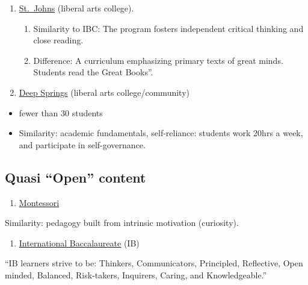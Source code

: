\documentclass[
]{book}
\providecommand{\tightlist}{%
  \setlength{\itemsep}{0pt}\setlength{\parskip}{0pt}}
\begin{document}
\begin{enumerate}
\def\labelenumi{\arabic{enumi}.}
\item
  \href{https://www.sjc.edu/academic-programs}{St.~Johns} (liberal arts college).

  \begin{enumerate}
  \def\labelenumii{\arabic{enumii}.}
  \tightlist
  \item
    Similarity to IBC: The program fosters independent critical thinking and close reading.
  \item
    Difference: A curriculum emphasizing primary texts of great minds. Students read the Great Books''.
  \end{enumerate}
\item
  \href{https://en.wikipedia.org/wiki/Deep_Springs_College}{Deep Springs} (liberal arts college/community)
\end{enumerate}

\begin{itemize}
\item
  fewer than 30 students
\item
  Similarity: academic fundamentals, self-reliance: students work 20hrs a week, and participate in self-governance.
\end{itemize}

\subsection{Quasi ``Open'' content}\label{quasi-open-content}

\begin{enumerate}
\def\labelenumi{\arabic{enumi}.}
\setcounter{enumi}{2}
\tightlist
\item
  \href{https://en.wikipedia.org/wiki/Montessori_education}{Montessori}
\end{enumerate}

Similarity: pedagogy built from intrinsic motivation (curiosity).

\begin{enumerate}
\def\labelenumi{\arabic{enumi}.}
\setcounter{enumi}{3}
\tightlist
\item
  \href{https://en.wikipedia.org/wiki/International_Baccalaureate}{International Baccalaureate} (IB)
\end{enumerate}

``IB learners strive to be: Thinkers, Communicators, Principled, Reflective, Open minded, Balanced, Risk-takers, Inquirers, Caring, and Knowledgeable.''
\end{document}
